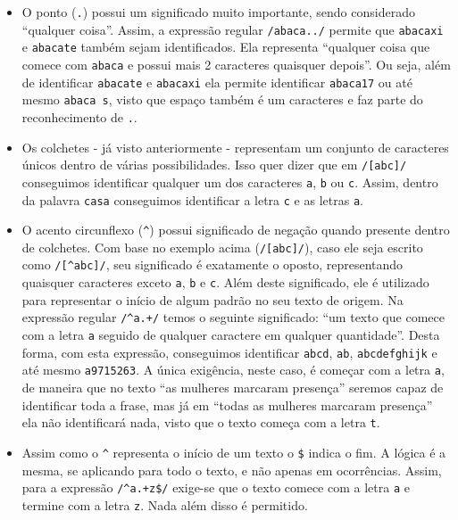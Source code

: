 \begin{itemize}

    \item O ponto (\texttt{.}) possui um significado muito importante, sendo considerado ``qualquer coisa''. Assim, a expressão regular \texttt{/abaca../} permite que \texttt{abacaxi} e \texttt{abacate} também sejam identificados. Ela representa ``qualquer coisa que comece com \texttt{abaca} e possui mais 2 caracteres quaisquer depois''. Ou seja, além de identificar \texttt{abacate} e \texttt{abacaxi} ela permite identificar \texttt{abaca17} ou até mesmo \texttt{abaca s}, visto que espaço também é um caracteres e faz parte do reconhecimento de \texttt{.}.

    \item Os colchetes - já visto anteriormente - representam um conjunto de caracteres únicos dentro de várias possibilidades. Isso quer dizer que em \texttt{/[abc]/} conseguimos identificar qualquer um dos caracteres \texttt{a}, \texttt{b} ou \texttt{c}. Assim, dentro da palavra \texttt{casa} conseguimos identificar a letra \texttt{c} e as letras \texttt{a}.

    \item O acento circunflexo (\texttt{\textasciicircum}) possui significado de negação quando presente dentro de colchetes. Com base no exemplo acima (\texttt{/[abc]/}), caso ele seja escrito como \texttt{/[\textasciicircum{abc}]/}, seu significado é exatamente o oposto, representando quaisquer caracteres exceto \texttt{a}, \texttt{b} e \texttt{c}. Além deste significado, ele é utilizado para representar o início de algum padrão no seu texto de origem. Na expressão regular \texttt{/\textasciicircum{a.+}/} temos o seguinte significado: ``um texto que comece com a letra \texttt{a} seguido de qualquer caractere em qualquer quantidade''. Desta forma, com esta expressão, conseguimos identificar \texttt{abcd}, \texttt{ab}, \texttt{abcdefghijk} e até mesmo \texttt{a9715263}. A única exigência, neste caso, é começar com a letra \texttt{a}, de maneira que no texto ``as mulheres marcaram presença'' seremos capaz de identificar toda a frase, mas já em ``todas as mulheres marcaram presença'' ela não identificará nada, visto que o texto começa com a letra \texttt{t}.

    \item Assim como o \texttt{\textasciicircum} representa o início de um texto o \texttt{\$} indica o fim. A lógica é a mesma, se aplicando para todo o texto, e não apenas em ocorrências. Assim, para a expressão \texttt{/\textasciicircum{a.+z}\$/} exige-se que o texto comece com a letra \texttt{a} e termine com a letra \texttt{z}. Nada além disso é permitido.


\end{itemize}
